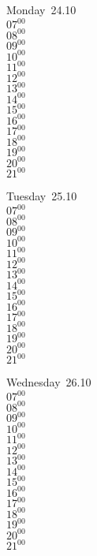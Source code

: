 \documentclass[11pt,a4paper]{book}\usepackage[]{graphicx}\usepackage[]{color}
\begin{document}
\begin{headerbox}
\end{headerbox}
\begin{weekdaybox}
  Monday~24.10\\
  { 
  \vfill
  $07^{00}$\\
$08^{00}$\\
$09^{00}$\\
$10^{00}$\\
$11^{00}$\\
$12^{00}$\\
$13^{00}$\\
$14^{00}$\\
$15^{00}$\\
$16^{00}$\\
$17^{00}$\\
$18^{00}$\\
$19^{00}$\\
$20^{00}$\\
$21^{00}$\\
  }
\end{weekdaybox}
\begin{weekdaybox}
  Tuesday~25.10\\
  { 
  \vfill
  $07^{00}$\\
$08^{00}$\\
$09^{00}$\\
$10^{00}$\\
$11^{00}$\\
$12^{00}$\\
$13^{00}$\\
$14^{00}$\\
$15^{00}$\\
$16^{00}$\\
$17^{00}$\\
$18^{00}$\\
$19^{00}$\\
$20^{00}$\\
$21^{00}$\\
  }
\end{weekdaybox}
\begin{weekdaybox}
  Wednesday~26.10\\
  { 
  \vfill
  $07^{00}$\\
$08^{00}$\\
$09^{00}$\\
$10^{00}$\\
$11^{00}$\\
$12^{00}$\\
$13^{00}$\\
$14^{00}$\\
$15^{00}$\\
$16^{00}$\\
$17^{00}$\\
$18^{00}$\\
$19^{00}$\\
$20^{00}$\\
$21^{00}$\\
  }
\end{weekdaybox}
\end{document}
